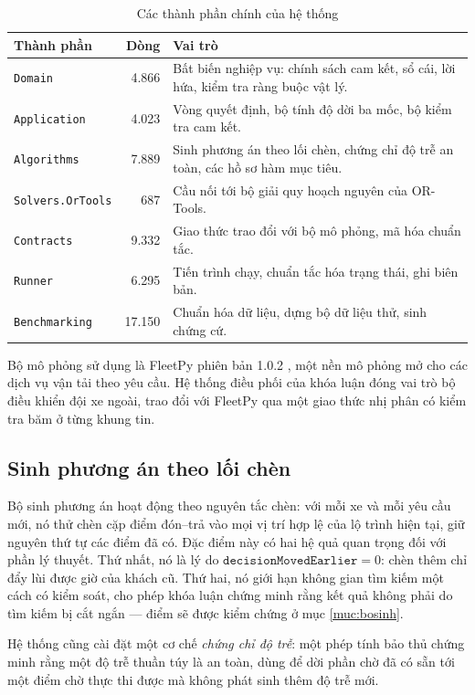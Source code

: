 \begin{table}[htbp]
\centering
\caption{Các thành phần chính của hệ thống}
\label{bang:kientruc}
\small
\begin{tabular}{@{}p{4.4cm}rp{7.4cm}@{}}
\toprule
\textbf{Thành phần} & \textbf{Dòng} & \textbf{Vai trò}\\
\midrule
\texttt{Domain} & 4.866 & Bất biến nghiệp vụ: chính sách cam kết, sổ cái, lời hứa, kiểm tra ràng buộc vật lý.\\
\texttt{Application} & 4.023 & Vòng quyết định, bộ tính độ dời ba mốc, bộ kiểm tra cam kết.\\
\texttt{Algorithms} & 7.889 & Sinh phương án theo lối chèn, chứng chỉ độ trễ an toàn, các hồ sơ hàm mục tiêu.\\
\texttt{Solvers.OrTools} & 687 & Cầu nối tới bộ giải quy hoạch nguyên của OR-Tools.\\
\texttt{Contracts} & 9.332 & Giao thức trao đổi với bộ mô phỏng, mã hóa chuẩn tắc.\\
\texttt{Runner} & 6.295 & Tiến trình chạy, chuẩn tắc hóa trạng thái, ghi biên bản.\\
\texttt{Benchmarking} & 17.150 & Chuẩn hóa dữ liệu, dựng bộ dữ liệu thử, sinh chứng cứ.\\
\bottomrule
\end{tabular}
\end{table}

Bộ mô phỏng sử dụng là FleetPy phiên bản 1.0.2 \cite{fleetpy2022}, một nền mô phỏng mở cho các
dịch vụ vận tải theo yêu cầu. Hệ thống điều phối của khóa luận đóng vai trò bộ điều khiển đội
xe ngoài, trao đổi với FleetPy qua một giao thức nhị phân có kiểm tra băm ở từng khung tin.

\subsection{Sinh phương án theo lối chèn}

Bộ sinh phương án hoạt động theo nguyên tắc chèn: với mỗi xe và mỗi yêu cầu mới, nó thử chèn
cặp điểm đón--trả vào mọi vị trí hợp lệ của lộ trình hiện tại, giữ nguyên thứ tự các điểm đã có.
Đặc điểm này có hai hệ quả quan trọng đối với phần lý thuyết. Thứ nhất, nó là lý do
$\mathtt{decisionMovedEarlier} = 0$: chèn thêm chỉ đẩy lùi được giờ của khách cũ. Thứ hai, nó
giới hạn không gian tìm kiếm một cách có kiểm soát, cho phép khóa luận chứng minh rằng kết quả
không phải do tìm kiếm bị cắt ngắn --- điểm sẽ được kiểm chứng ở mục \ref{muc:bosinh}.

Hệ thống cũng cài đặt một cơ chế \emph{chứng chỉ độ trễ}: một phép tính bảo thủ chứng minh rằng
một độ trễ thuần túy là an toàn, dùng để dời phần chờ đã có sẵn tới một điểm chờ thực thi được
mà không phát sinh thêm độ trễ mới.

